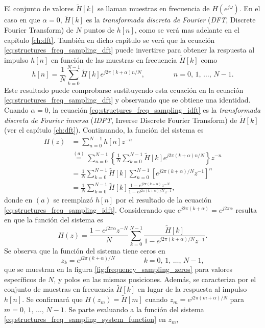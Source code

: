 \documentclass[a4paper]{report}
\begin{document}
El conjunto de valores \(\tilde{H}[k]\) se llaman muestras en frecuencia de \(H(e^{j\omega})\). En el caso en que \(\alpha=0\), \(\tilde{H}[k]\) es la \emph{transformada discreta de Fourier} (\emph{DFT}, Discrete Fourier Transform) de \(N\) puntos de \(h[n]\), como se verá mas adelante en el capítulo \ref{ch:dft}. También en dicho capítulo se verá que la ecuación \ref{eq:structures_freq_sampling_dft} puede invertirse para obtener la respuesta al impulso \(h[n]\) en función de las muestras en frecuencia \(\tilde{H}[k]\) como
\begin{equation}\label{eq:structures_freq_sampling_idft}
 h[n]=\frac{1}{N}\sum_{k=0}^{N-1}\tilde{H}[k]e^{j2\pi(k+\alpha)n/N},
 \qquad\qquad 
 n=0,\,1,\,\dots,\,N-1.  
\end{equation}
Este resultado puede comprobarse sustituyendo esta ecuación en la ecuación \ref{eq:structures_freq_sampling_dft} y observando que se obtiene una identidad. Cuando \(\alpha=0\), la ecuación \ref{eq:structures_freq_sampling_idft} es la \emph{transformada discreta de Fourier inversa} (\emph{IDFT}, Inverse Discrete Fourier Transform) de \(\tilde{H}[k]\) (ver el capítulo \ref{ch:dft}). Continuando, la función del sistema es
\begin{align*}
 H(z)&=\sum_{n=0}^{N-1}h[n]z^{-n}\\
  &\overset{(a)}{=}\sum_{n=0}^{N-1}\left\{\frac{1}{N}\sum_{k=0}^{N-1}\tilde{H}[k]e^{j2\pi(k+\alpha)n/N}\right\}z^{-n}\\
  &=\frac{1}{N}\sum_{k=0}^{N-1}\tilde{H}[k]\sum_{n=0}^{N-1}\left[e^{j2\pi(k+\alpha)/N}z^{-1}\right]^n\\
  &=\frac{1}{N}\sum_{k=0}^{N-1}\tilde{H}[k]\frac{1-e^{j2\pi(k+\alpha)}z^{-N}}{1-e^{j2\pi(k+\alpha)/N}z^{-1}},
\end{align*}
donde en \((a)\) se reemplazó \(h[n]\) por el resultado de la ecuación \ref{eq:structures_freq_sampling_idft}. Considerando que \(e^{j2\pi(k+\alpha)}=e^{j2\pi\alpha}\) resulta en que la función del sistema es
\begin{equation}\label{eq:structures_freq_sampling_system_function}
 H(z)=\frac{1-e^{j2\pi\alpha}z^{-N}}{N}\sum_{k=0}^{N-1}\frac{\tilde{H}[k]}{1-e^{j2\pi(k+\alpha)/N}z^{-1}}.
\end{equation}
Se observa que la función del sistema tiene ceros en 
\[
 z_k=e^{j2\pi(k+\alpha)/N}
 \qquad\qquad 
 k=0,\,1,\,\dots,\,N-1,  
\]
que se muestran en la figura \ref{fig:frequency_sampling_zeros} para valores específicos de \(N\), y polos en las mismas posiciones. Además, se caracteriza por el conjunto de muestras en frecuencia \(\tilde{H}[k]\) en lugar de la respuesta al impulso \(h[n]\). Se confirmará que \(H(z_m)=\tilde{H}[m]\) cuando \(z_m=e^{j2\pi(m+\alpha)/N}\) para \(m=0,\,1,\,\dots,\,N-1\). Se parte evaluando a la función del sistema \ref{eq:structures_freq_sampling_system_function} en \(z_m\),
\end{document}
